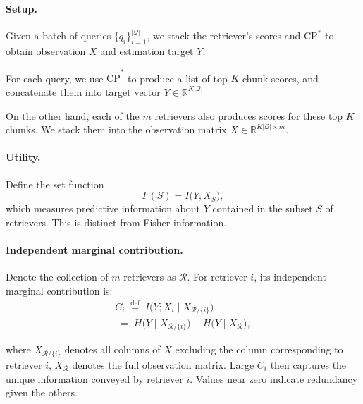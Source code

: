 \documentclass{article}
\theoremstyle{plain}
\theoremstyle{definition}
\theoremstyle{remark}
\begin{document}
\paragraph{Setup.}
Given a batch of queries $\{q_i\}_{i=1}^{|\mathcal{Q}|}$, we stack the retriever's scores and \texorpdfstring{$\mathrm{CP}^\ast$}{CP*} to obtain observation $X$ and estimation target $Y$.

For each query, we use $\widetilde{\mathrm{CP}}^\ast$ to produce a list of top $K$ chunk scores, and concatenate them into target vector $Y\in\mathbb{R}^{K|\mathcal{Q}|}$

On the other hand, each of the $m$ retrievers also produces scores for these top $K$ chunks. We stack them into the observation matrix $X\in\mathbb{R}^{K|\mathcal{Q}|\times m}$.

\paragraph{Utility.}
Define the set function
\begin{equation}
\label{eq:util}
F(S)=I\big(Y;X_S\big),
\end{equation}
which measures predictive information about $Y$ contained in the subset $S$ of retrievers. This is distinct from Fisher information.

\paragraph{Independent marginal contribution.}
Denote the collection of $m$ retrievers as $\mathcal{R}$. For retriever $i$, its independent marginal contribution is:
\begin{multline}
C_i\;\stackrel{\text{def}}{=} \;I\big(Y;X_i\mid X_{\mathcal{R}/\{i\}}\big)\\ 
\;=\;H\big(Y\mid X_{\mathcal{R}/\{i\}}\big)-H\big(Y\mid X_{\mathcal{R}}\big),
\end{multline}

where $X_{\mathcal{R}/\{i\}}$ denotes all columns of $X$ excluding the column corresponding to retriever $i$, $X_{\mathcal{R}}$ denotes the full observation matrix. Large $C_i$ then captures the unique information conveyed by retriever $i$. Values near zero indicate redundancy given the others.

\end{document}
